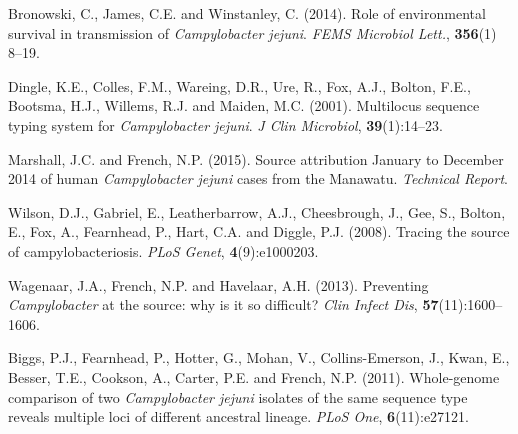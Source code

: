 \documentclass[12pt]{article}
\begin{document}
\begin{description}

\item
Bronowski, C., James, C.E. and Winstanley, C. (2014).
Role of environmental survival in transmission of \textit{Campylobacter jejuni}.
\textit{FEMS Microbiol Lett.}, \textbf{356}(1) 8--19.

\item
Dingle, K.E., Colles, F.M., Wareing, D.R., Ure, R., Fox, A.J., Bolton, F.E., Bootsma, H.J., Willems, R.J. and Maiden, M.C. (2001).  
Multilocus sequence typing system for \textit{Campylobacter jejuni}.
\textit{J Clin Microbiol}, \textbf{39}(1):14--23.

\item
Marshall, J.C. and French, N.P. (2015).
Source attribution January to December 2014 of human \textit{Campylobacter jejuni} cases from the Manawatu.
\textit{Technical {R}eport}.

\item
Wilson, D.J., Gabriel, E., Leatherbarrow, A.J., Cheesbrough, J., Gee, S., Bolton, E., Fox, A., Fearnhead, P., Hart, C.A. and Diggle, P.J. (2008).
Tracing the source of campylobacteriosis.
\textit{PLoS Genet}, \textbf{4}(9):e1000203.

\item
Wagenaar, J.A., French, N.P. and Havelaar, A.H. (2013).
Preventing \textit{Campylobacter} at the source: why is it so difficult?
\textit{Clin Infect Dis}, \textbf{57}(11):1600--1606.

\item
Biggs, P.J., Fearnhead, P., Hotter, G., Mohan, V., Collins-Emerson, J., Kwan, E., Besser, T.E., Cookson, A., Carter, P.E. and French, N.P. (2011).
Whole-genome comparison of two \textit{Campylobacter jejuni} isolates of the same sequence type reveals multiple loci of different ancestral lineage.
\textit{PLoS One}, \textbf{6}(11):e27121.

  
\end{description}
\end{document}
